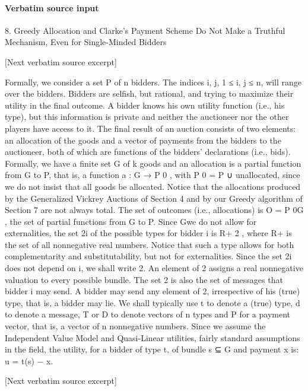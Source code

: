 \documentclass[10pt]{article}
\begin{document}
\paragraph{Verbatim source input}
\begin{ReviewVerbatim}
8. Greedy Allocation and Clarke’s Payment Scheme Do Not Make a Truthful
Mechanism, Even for Single-Minded Bidders

[Next verbatim source excerpt]

Formally, we consider a set P of n bidders. The indices i, j, 1 ≤ i, j ≤ n, will
range over the bidders. Bidders are selfish, but rational, and trying to maximize their
utility in the final outcome. A bidder knows his own utility function (i.e., his type),
but this information is private and neither the auctioneer nor the other players have
access to it. The final result of an auction consists of two elements: an allocation
of the goods and a vector of payments from the bidders to the auctioneer, both of
which are functions of the bidders’ declarations (i.e., bids). Formally, we have a
finite set G of k goods and an allocation is a partial function from G to P, that is, a
function a : G → P 0 , with P 0 = P ∪ {unallocated}, since we do not insist that all
goods be allocated. Notice that the allocations produced by the Generalized Vickrey
Auctions of Section 4 and by our Greedy algorithm of Section 7 are not always
total. The set of outcomes (i.e., allocations) is O = P 0G , the set of partial functions
from G to P. Since Gwe do not allow for externalities, the set 2i of the possible types
for bidder i is R+ 2 , where R+ is the set of all nonnegative real numbers. Notice
that such a type allows for both complementarity and substitutability, but not for
externalities. Since the set 2i does not depend on i, we shall write 2. An element
of 2 assigns a real nonnegative valuation to every possible bundle. The set 2 is
also the set of messages that bidder i may send. A bidder may send any element of
2, irrespective of his (true) type, that is, a bidder may lie. We shall typically use t
to denote a (true) type, d to denote a message, T or D to denote vectors of n types
and P for a payment vector, that is, a vector of n nonnegative numbers.
Since we assume the Independent Value Model and Quasi-Linear utilities, fairly
standard assumptions in the field, the utility, for a bidder of type t, of bundle s ⊆ G
and payment x is:
u = t(s) − x.

[Next verbatim source excerpt]


\end{ReviewVerbatim}
\end{document}
